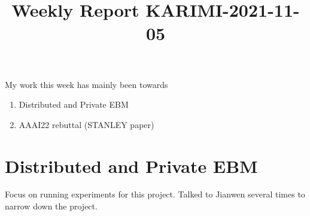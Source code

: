 \documentclass{article}
\begin{document}
\title{Weekly Report KARIMI-2021-11-05}


\date{}
\maketitle

\vspace{-0.5in}


My work this week has mainly been towards
\begin{enumerate}
\item Distributed and Private EBM
\item AAAI22 rebuttal (STANLEY paper)
\end{enumerate}

\section{Distributed and Private EBM}
Focus on running experiments for this project.
Talked to Jianwen several times to narrow down the project.
\end{document}
